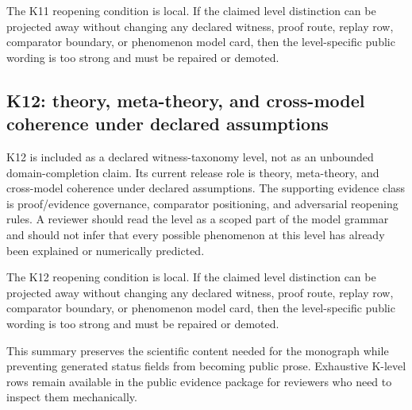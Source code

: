 The K11 reopening condition is local. If the claimed level distinction can be projected away without changing any declared witness, proof route, replay row, comparator boundary, or phenomenon model card, then the level-specific public wording is too strong and must be repaired or demoted.


\subsection{K12: theory, meta-theory, and cross-model coherence under declared assumptions}

K12 is included as a declared witness-taxonomy level, not as an unbounded domain-completion claim. Its current release role is theory, meta-theory, and cross-model coherence under declared assumptions. The supporting evidence class is proof/evidence governance, comparator positioning, and adversarial reopening rules. A reviewer should read the level as a scoped part of the model grammar and should not infer that every possible phenomenon at this level has already been explained or numerically predicted.


The K12 reopening condition is local. If the claimed level distinction can be projected away without changing any declared witness, proof route, replay row, comparator boundary, or phenomenon model card, then the level-specific public wording is too strong and must be repaired or demoted.


This summary preserves the scientific content needed for the monograph while preventing generated status fields from becoming public prose. Exhaustive K-level rows remain available in the public evidence package for reviewers who need to inspect them mechanically.
